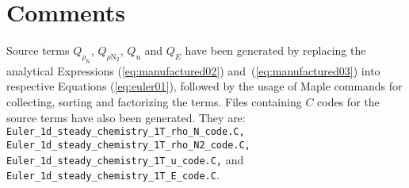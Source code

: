 \documentclass[10pt]{article}
\begin{document}
\section{Comments}


Source terms $Q_{\rho_\text{N} }$, $Q_{\rho \text{N}_{2}}$, $Q_u$ and $Q_E$ have been generated by replacing the analytical Expressions (\ref{eq:manufactured02}) and~(\ref{eq:manufactured03}) into respective Equations (\ref{eq:euler01}), followed by the usage of Maple commands for collecting, sorting and factorizing the terms. Files containing $C$ codes for the source terms have also been generated. They are: \texttt{ Euler\_1d\_steady\_chemistry\_1T\_rho\_N\_code.C, Euler\_1d\_steady\_chemistry\_1T\_rho\_N2\_code.C,\\ Euler\_1d\_steady\_chemistry\_1T\_u\_code.C,} and \texttt{Euler\_1d\_steady\_chemistry\_1T\_E\_code.C}.
\end{document}
